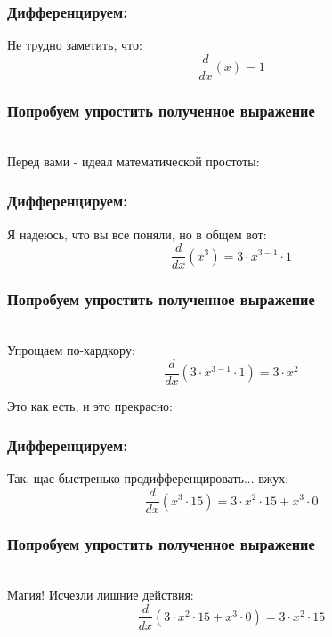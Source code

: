\documentclass[a4paper,12pt]{article}
\begin{document}
\subsubsection*{Дифференцируем:}

Не трудно заметить, что:
\begin{dmath}\frac{d}{dx}\left(x\right)=1\end{dmath}
\subsubsection*{Попробуем упростить полученное выражение}
\\Перед вами - идеал математической простоты:

\subsubsection*{Дифференцируем:}

Я надеюсь, что вы все поняли, но в общем вот:
\begin{dmath}\frac{d}{dx}\left(x^{3}\right)=3\cdot x^{3- 1}\cdot 1\end{dmath}
\subsubsection*{Попробуем упростить полученное выражение}
\\Упрощаем по-хардкору:\\
\begin{dmath}
	\frac{d}{dx}\left(3\cdot x^{3- 1}\cdot 1\right) = 3\cdot x^{2}\end{dmath}

Это как есть, и это прекрасно:

\subsubsection*{Дифференцируем:}

Так, щас быстренько продифференцировать... вжух:
\begin{dmath}\frac{d}{dx}\left(x^{3}\cdot 15\right)=3\cdot x^{2}\cdot 15+ x^{3}\cdot 0\end{dmath}
\subsubsection*{Попробуем упростить полученное выражение}
\\Магия! Исчезли лишние действия:\\
\begin{dmath}
	\frac{d}{dx}\left(3\cdot x^{2}\cdot 15+ x^{3}\cdot 0\right) = 3\cdot x^{2}\cdot 15\end{dmath}
\end{document}
